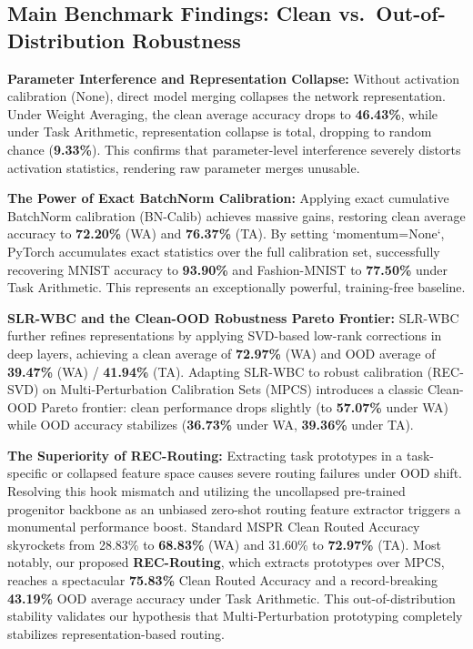 \documentclass{article}
\theoremstyle{plain}
\theoremstyle{definition}
\theoremstyle{remark}
\begin{document}
\subsection{Main Benchmark Findings: Clean vs.\ Out-of-Distribution Robustness}
\label{subsec:main_results}

\textbf{Parameter Interference and Representation Collapse:} Without activation calibration (None), direct model merging collapses the network representation. Under Weight Averaging, the clean average accuracy drops to \textbf{46.43\%}, while under Task Arithmetic, representation collapse is total, dropping to random chance (\textbf{9.33\%}). This confirms that parameter-level interference severely distorts activation statistics, rendering raw parameter merges unusable.

\textbf{The Power of Exact BatchNorm Calibration:} Applying exact cumulative BatchNorm calibration (BN-Calib) achieves massive gains, restoring clean average accuracy to \textbf{72.20\%} (WA) and \textbf{76.37\%} (TA). By setting `momentum=None`, PyTorch accumulates exact statistics over the full calibration set, successfully recovering MNIST accuracy to \textbf{93.90\%} and Fashion-MNIST to \textbf{77.50\%} under Task Arithmetic. This represents an exceptionally powerful, training-free baseline.

\textbf{SLR-WBC and the Clean-OOD Robustness Pareto Frontier:} SLR-WBC further refines representations by applying SVD-based low-rank corrections in deep layers, achieving a clean average of \textbf{72.97\%} (WA) and OOD average of \textbf{39.47\%} (WA) / \textbf{41.94\%} (TA). Adapting SLR-WBC to robust calibration (REC-SVD) on Multi-Perturbation Calibration Sets (MPCS) introduces a classic Clean-OOD Pareto frontier: clean performance drops slightly (to \textbf{57.07\%} under WA) while OOD accuracy stabilizes (\textbf{36.73\%} under WA, \textbf{39.36\%} under TA).

\textbf{The Superiority of REC-Routing:} Extracting task prototypes in a task-specific or collapsed feature space causes severe routing failures under OOD shift. Resolving this hook mismatch and utilizing the uncollapsed pre-trained progenitor backbone as an unbiased zero-shot routing feature extractor triggers a monumental performance boost. Standard MSPR Clean Routed Accuracy skyrockets from 28.83\% to \textbf{68.83\%} (WA) and 31.60\% to \textbf{72.97\%} (TA). Most notably, our proposed \textbf{REC-Routing}, which extracts prototypes over MPCS, reaches a spectacular \textbf{75.83\%} Clean Routed Accuracy and a record-breaking \textbf{43.19\%} OOD average accuracy under Task Arithmetic. This out-of-distribution stability validates our hypothesis that Multi-Perturbation prototyping completely stabilizes representation-based routing.
\end{document}
